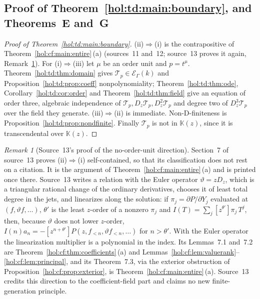 \documentclass[11pt]{article}
\numberwithin{equation}{section}
\theoremstyle{definition}
\theoremstyle{remark}
\newtheorem{remark}[theorem]{Remark}
\newcommand{\KK}{\mathbb K}
\newcommand{\EK}{\mathcal E_\Gamma(k)}
\begin{document}
\subsection{Proof of Theorem~\ref{hol:td:main:boundary}, and Theorems~E
and~G}\label{hol:td:sub:proofs}

\begin{proof}[Proof of Theorem~\ref{hol:td:main:boundary}]
(ii)$\Rightarrow$(i) is the contrapositive of
Theorem~\ref{hol:cf:main:entire}\,(a) (sources~11 and~12; source~13 proves it
again, Remark~\ref{hol:td:rem:euler}). For (i)$\Rightarrow$(iii) let $\mu$ be
an order unit and $p=t^\mu$. Theorem~\ref{hol:td:thm:domain} gives
$\mathcal T_p\in\EK$ and Proposition~\ref{hol:td:prop:coeff} nonpolynomiality;
Theorem~\ref{hol:td:thm:ode}, Corollary~\ref{hol:td:cor:order} and
Theorem~\ref{hol:td:thm:field} give an equation of order three, algebraic
independence of $\mathcal T_p,D_z\mathcal T_p,D_z^2\mathcal T_p$ and degree two
of $D_z^3\mathcal T_p$ over the field they generate.
(iii)$\Rightarrow$(ii) is immediate. Non-D-finiteness is
Proposition~\ref{hol:td:prop:nondfinite}. Finally $\mathcal T_p$ is not in
$\KK(z)$, since it is transcendental over $\KK(z)$.
\end{proof}

\begin{remark}[Source~13's proof of the no-order-unit direction]
\label{hol:td:rem:euler}
Section~7 of source~13 proves (ii)$\Rightarrow$(i) self-contained, so that its
classification does not rest on a citation. It is the argument of
Theorem~\ref{hol:cf:main:entire}\,(a) and is printed once there. Source~13
writes a relation with the Euler operator $\vartheta=zD_z$, which is a
triangular rational change of the ordinary derivatives, chooses it of least
total degree in the jets, and linearizes along the solution: if
$\pi_j=\partial P/\partial Y_j$ evaluated at $(f,\vartheta f,\ldots)$, $\theta'$
is the least $z$-order of a nonzero $\pi_j$ and
$I(T)=\sum_j[z^{\theta'}]\pi_j\,T^j$, then, because $\vartheta$ does not lower
$z$-order, $I(n)a_n=-[z^{n+\theta'}]P(z,f_{<n},\vartheta f_{<n},\ldots)$ for
$n>\theta'$. With the Euler operator the linearization multiplier is a
polynomial in the index. Its Lemmas~7.1 and~7.2 are
Theorem~\ref{hol:cf:thm:coefficients}\,(a) and
Lemmas~\ref{hol:cf:lem:valuerank}--\ref{hol:cf:lem:principal}, and its
Theorem~7.3, via the exterior obstruction of
Proposition~\ref{hol:cf:prop:exterior}, is
Theorem~\ref{hol:cf:main:entire}\,(a). Source~13 credits this direction to the
coefficient-field part and claims no new finite-generation principle.
\end{remark}
\end{document}
